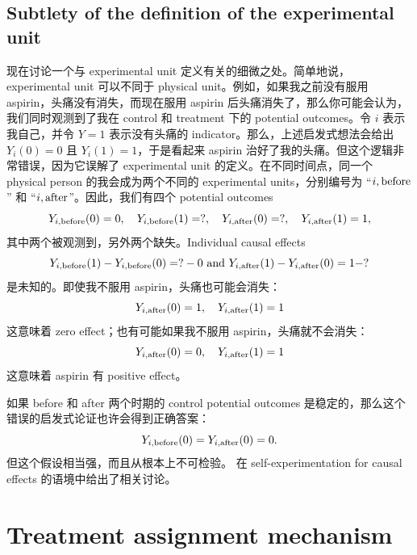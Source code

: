 \subsection{Subtlety of the definition of the experimental unit}

现在讨论一个与 experimental unit 定义有关的细微之处。简单地说，experimental unit 可以不同于 physical unit。例如，如果我之前没有服用 aspirin，头痛没有消失，而现在服用 aspirin 后头痛消失了，那么你可能会认为，我们同时观测到了我在 control 和 treatment 下的 potential outcomes。令 $i$ 表示我自己，并令 $Y=1$ 表示没有头痛的 indicator。那么，上述启发式想法会给出 $Y_i(0) = 0$ 且 $Y_i(1) = 1$，于是看起来 aspirin 治好了我的头痛。但这个逻辑非常错误，因为它误解了 experimental unit 的定义。在不同时间点，同一个 physical person 的我会成为两个不同的 experimental units，分别编号为 ``$i,\textup{before}$'' 和 ``$i,\textup{after}$''。因此，我们有四个 potential outcomes
$$
Y_{i,\textup{before}}(0)=0, \quad  Y_{i,\textup{before}}(1)=?,\quad
Y_{i,\textup{after}}(0)=?, \quad  Y_{i,\textup{after}}(1)=1,
$$ 
其中两个被观测到，另外两个缺失。Individual causal effects
$$
Y_{i,\textup{before}}(1) -  Y_{i,\textup{before}}(0) = ? - 0 \text{ and } Y_{i,\textup{after}}(1)  - Y_{i,\textup{after}}(0) = 1 - ?
$$ 
是未知的。即使我不服用 aspirin，头痛也可能会消失：
$$
Y_{i,\textup{after}}(0)=1, \quad  Y_{i,\textup{after}}(1)=1
$$
这意味着 zero effect；也有可能如果我不服用 aspirin，头痛就不会消失：
$$
Y_{i,\textup{after}}(0)=0, \quad  Y_{i,\textup{after}}(1)=1
$$
这意味着 aspirin 有 positive effect。

如果 before 和 after 两个时期的 control potential outcomes 是稳定的，那么这个错误的启发式论证也许会得到正确答案：
$$
Y_{i,\textup{before}}(0) = Y_{i,\textup{after}}(0) = 0 .
$$ 
但这个假设相当强，而且从根本上不可检验。\citet{rubin2001comment} 在 self-experimentation for causal effects 的语境中给出了相关讨论。



\section{Treatment assignment mechanism}\label{sec::Treatment-ScienceTable}

